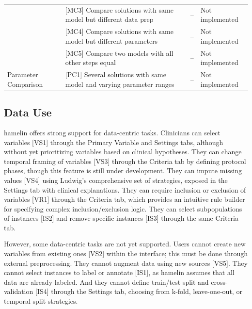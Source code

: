 \documentclass[conference,onecolumn]{IEEEtran}
\begin{document}
\begin{table}[t]
\begin{tabular}{@{}l l l l@{}}
& \parbox[t]{0.28\columnwidth}{[MC3] Compare solutions with same model but different data prep} & \parbox[t]{0.32\columnwidth}{--} & \parbox[t]{0.17\columnwidth}{Not implemented} \\
& \parbox[t]{0.28\columnwidth}{[MC4] Compare solutions with same model but different parameters} & \parbox[t]{0.32\columnwidth}{--} & \parbox[t]{0.17\columnwidth}{Not implemented} \\
& \parbox[t]{0.28\columnwidth}{[MC5] Compare two models with all other steps equal} & \parbox[t]{0.32\columnwidth}{--} & \parbox[t]{0.17\columnwidth}{Not implemented} \\
\cmidrule(lr){1-4}
\parbox[t]{0.18\columnwidth}{Parameter Comparison} 
& \parbox[t]{0.28\columnwidth}{[PC1] Several solutions with same model and varying parameter ranges} & \parbox[t]{0.32\columnwidth}{--} & \parbox[t]{0.17\columnwidth}{Not implemented} \\
\bottomrule
\end{tabular}
\end{table}

  
\subsection{Data Use}  
  
\gls{hamelin} offers strong support for data-centric tasks. Clinicians can select variables [VS1] through the Primary Variable and Settings tabs, although without yet prioritizing variables based on clinical hypotheses. They can change temporal framing of variables [VS3] through the Criteria tab by defining protocol phases, though this feature is still under development. They can impute missing values [VS4] using Ludwig's comprehensive set of strategies, exposed in the Settings tab with clinical explanations. They can require inclusion or exclusion of variables [VR1] through the Criteria tab, which provides an intuitive rule builder for specifying complex inclusion/exclusion logic. They can select subpopulations of instances [IS2] and remove specific instances [IS3] through the same Criteria tab.
  
However, some data-centric tasks are not yet supported. Users cannot create new variables from existing ones [VS2] within the interface; this must be done through external preprocessing. They cannot augment data using new sources [VS5]. They cannot select instances to label or annotate [IS1], as \gls{hamelin} assumes that all data are already labeled. And they cannot define train/test split and cross-validation [IS4] through the Settings tab, choosing from k-fold, leave-one-out, or temporal split strategies.
  
\end{document}
